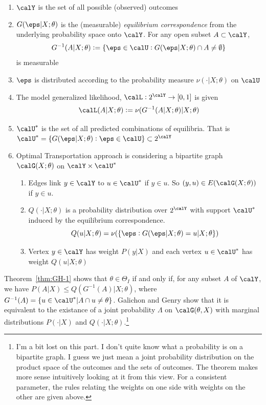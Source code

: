 \begin{enumerate}
	\item \(\calY\) is the set of all possible (observed) outcomes
	\item \(G(\eps | X;\theta)\) is the (measurable) {\it equilibrium correspondence} from the underlying probability space onto \(\calY\). For any open subset \(A \subset \calY\),
	\[G^{-1}(A|X;\theta) := \{\eps\in\calU: G(\eps|X;\theta) \cap A \neq \emptyset\}\]
	is measurable
	\item \(\eps\) is distributed according to the probability measure $\nu(\cdot | X;\theta)$ on \(\calU\)
	\item The model generalized likelihood, \(\calL: 2^\calY \to [0,1]\) is given
	\[\calL(A|X;\theta) := \nu(G^{-1}(A | X;\theta) | X;\theta)\]
	\item \(\calU^*\) is the set of all predicted combinations of equilibria. That is \(\calU^* = \{G(\eps|X;\theta): \eps \in \calU\} \subset 2^\calY\)
	\item Optimal Transportation approach is considering a bipartite graph \(\calG(X;\theta)\) on $\calY \times \calU^*$
	\begin{enumerate}
		\item Edges link $y \in \calY$ to $u\in \calU^*$ if $y \in u$. So $(y,u) \in E(\calG(X;\theta))$ if $y \in u$.
		\item \(Q(\cdot|X;\theta)\) is a probability distribution over $2^\calY$ with support $\calU^*$ induced by the equilibrium correspondence.
		\[Q(u|X;\theta) = \nu(\{\eps: G(\eps|X;\theta) = u | X;\theta\})\]
		\item Vertex $y\in \calY$ has weight $P(y|X)$ and each vertex $u\in \calU^*$ has weight $Q(u|X;\theta)$
	\end{enumerate}
\end{enumerate}

Theorem~\ref{thm:GH-1} shows that $\theta \in \Theta_I$ if and only if, for any subset $A$ of $\calY$, we have $P(A|X) \leq Q(G^{-1}(A)|X;\theta)$, where $G^{-1}(A) = \{u\in\calU^* | A\cap u \neq \theta\}$. Galichon and Genry show that it is equivalent to the existance of a joint probability $\Lambda$ on $\calG(\theta, X)$ with marginal distributions $P(\cdot| X)$ and $Q(\cdot|X;\theta)$.\footnote{I'm a bit lost on this part. I don't quite know what a probability is on a bipartite graph. I guess we just mean a joint probability distribution on the product space of the outcomes and the sets of outcomes. The theorem makes more sense intuitively looking at it from this view. For a consistent parameter, the rules relating the weights on one side with weights on the other are given above.}

